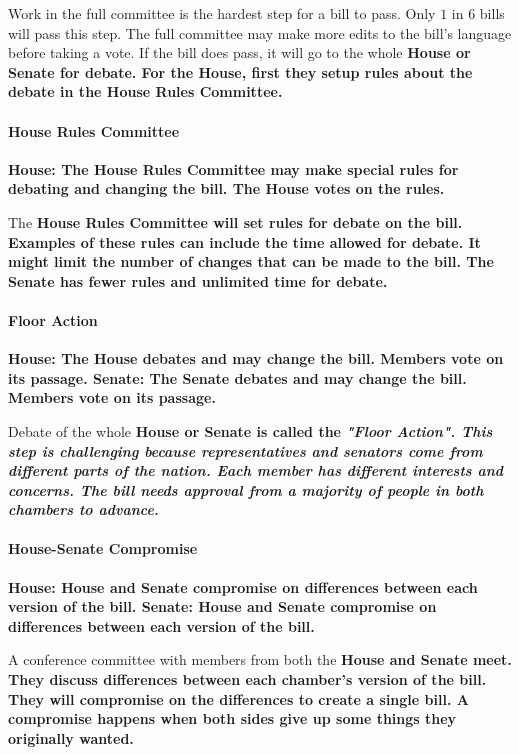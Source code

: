 Work in the full committee is the hardest step for a bill to pass. Only $1$ in $6$ bills will pass this step. The full committee may make more edits to the bill's language before taking a vote. If the bill does pass, it will go to the whole \bf{House} or \bf{Senate} for debate. For the \bf{House}, first they setup rules about the debate in the \bf{House Rules Committee}.

\paragraph{House Rules Committee}

\bf{House}: The \bf{House Rules Committee} may make special rules for debating and changing the bill. The \bf{House} votes on the rules.

The \bf{House Rules Committee} will set rules for debate on the bill. Examples of these rules can include the time allowed for debate. It might limit the number of changes that can be made to the bill. The \bf{Senate} has fewer rules and unlimited time for debate.

\paragraph{Floor Action}

\bf{House}: The \bf{House} debates and may change the bill. Members vote on its passage.
\bf{Senate}: The \bf{Senate} debates and may change the bill. Members vote on its passage.

Debate of the whole \bf{House} or \bf{Senate} is called the \it{"Floor Action"}. This step is challenging because representatives and senators come from different parts of the nation. Each member has different interests and concerns. The bill needs approval from a majority of people in both chambers to advance.

\paragraph{House-Senate Compromise}

\bf{House}: \bf{House} and \bf{Senate} compromise on differences between each version of the bill.
\bf{Senate}: \bf{House} and \bf{Senate} compromise on differences between each version of the bill.

A conference committee with members from both the \bf{House} and \bf{Senate} meet. They discuss differences between each chamber's version of the bill. They will compromise on the differences to create a single bill. A compromise happens when both sides give up some things they originally wanted.

